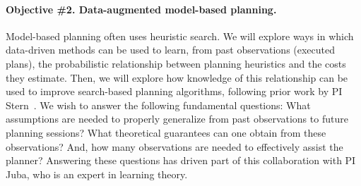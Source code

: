 \documentclass[12pt]{article}
\newcommand{\note}[1]{\textbf{\textit{#1}}}
\begin{document}
\vspace{-0.35cm}
\paragraph{Objective \#2. Data-augmented model-based planning.}
Model-based planning often uses heuristic search. We will explore ways in which data-driven methods can be used to learn, from past observations (executed plans), the probabilistic relationship between planning heuristics and the costs they estimate. Then, we will explore how knowledge of this relationship can be used to improve search-based planning algorithms, following prior work by PI Stern~\cite{stern2011probably,stern2012exploring,stern2014potential}.
We wish to answer the following fundamental questions: What assumptions are needed to properly generalize from past observations to future planning sessions? What theoretical guarantees can one obtain from these observations? And, how many observations are needed to effectively assist the planner? Answering these questions has driven part of this collaboration with PI Juba, who is an expert in learning theory. 




\end{document}
